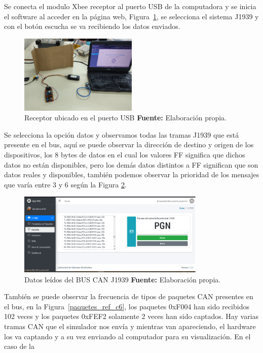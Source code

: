 Se conecta el modulo Xbee receptor al puerto USB de la computadora y se inicia el software al acceder en la página web, Figura~\ref{receptor_ref_c6},  se selecciona el sistema J1939 y con el botón escucha se va recibiendo los datos enviados. 


\begin{figure}[H]
	\centering
	\includegraphics[width=0.5\textwidth]{./Cap6imagen/receptor_fig_c6.jpg}
	\caption [Receptor ubicado en el puerto USB.]{Receptor ubicado en el puerto USB \textbf{ Fuente:} %
		Elaboración propia.}
	\label{receptor_ref_c6} %
\end{figure}

Se selecciona la opción datos y observamos todas las tramas J1939 que está presente en el bus, aquí se puede observar la dirección de destino y origen de los dispositivos, los 8 bytes de datos en el cual los valores FF significa que dichos datos no están disponibles, pero los demás datos distintos a FF significan que son datos reales y disponibles, también podemos observar la prioridad de los mensajes que varía entre 3 y 6 según la Figura \ref{escucha_ref_c6}.

\begin{figure}[H]
	\centering
	\includegraphics[width=0.8\textwidth]{./Cap6imagen/escucha_fig_c6.png}
	\caption [Datos leídos del BUS CAN J1939.]{Datos leídos del BUS CAN J1939 \textbf{ Fuente:} %
		Elaboración propia.}
	\label{escucha_ref_c6} %
\end{figure}


También se puede observar la frecuencia de tipos de paquetes CAN presentes en el bus, en la Figura~\ref{paquetes_ref_c6}, los paquetes 0xF004 han sido recibidos 102 veces y los paquetes 0xFEF2 solamente 2 veces han sido captados. 
Hay varias tramas CAN que el simulador nos envía y mientras van apareciendo, el hardware los va captando y a su vez enviando al computador para su visualización. 
En el caso de la 


